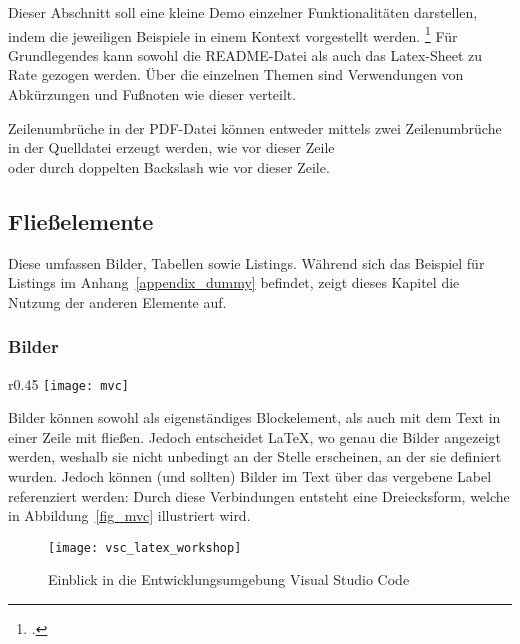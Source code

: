 Dieser Abschnitt soll eine kleine Demo einzelner Funktionalitäten darstellen, indem die jeweiligen Beispiele in einem Kontext vorgestellt werden.
\footcite[An dieser Stelle soll erneut auf die Lizenz hingewiesen werden. Siehe][]{ccOJlizenz}
Für Grundlegendes kann sowohl die README-Datei als auch das Latex-Sheet zu Rate gezogen werden. 
Über die einzelnen Themen sind Verwendungen von Abkürzungen und Fußnoten wie dieser verteilt. 

Zeilenumbrüche in der PDF-Datei können entweder mittels zwei Zeilenumbrüche in der Quelldatei erzeugt werden, wie vor dieser Zeile\\
oder durch doppelten Backslash wie vor dieser Zeile.

\subsection{Fließelemente}
  Diese umfassen Bilder, Tabellen sowie Listings.
  Während sich das Beispiel für Listings im Anhang~\ref{appendix_dummy} befindet, zeigt dieses Kapitel die Nutzung der anderen Elemente auf.

 \subsubsection{Bilder}
    \begin{wrapfigure}{r}{0.45\linewidth}
      \vspace{-30pt}
      \centering
      \texttt{[image: mvc]}
      \caption[Aufbau von \acrlong{MVC}]{Aufbau von \gls{MVC}.\\Quelle: Angelehnt an \cite{curry2008flexible}}
      \label{fig_mvc}
    \end{wrapfigure}
    Bilder können sowohl als eigenständiges Blockelement, als auch mit dem Text in einer Zeile mit fließen.
    Jedoch entscheidet \LaTeX, wo genau die Bilder angezeigt werden, weshalb sie nicht unbedingt an der Stelle erscheinen,
    an der sie definiert wurden.
    Jedoch können (und sollten) Bilder im Text über das vergebene Label referenziert werden:
    Durch diese Verbindungen entsteht eine Dreiecksform, welche in Abbildung~\ref{fig_mvc} illustriert wird.

    \begin{figure}[tbh]
      \centering
      \texttt{[image: vsc\_latex\_workshop]}
      \caption{Einblick in die Entwicklungsumgebung Visual Studio Code}
      \label{fig_prototyp_desktop}
    \end{figure}


